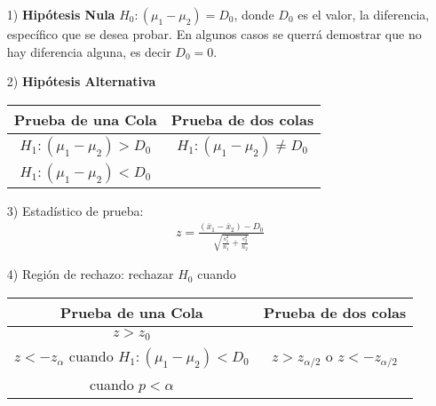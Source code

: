 \documentclass[a4paper]{report} %
\begin{document}
\begin{itemize}
\item[1) ] \textbf{Hip\'otesis Nula} $H_{0}:\left(\mu_{1}-\mu_{2}\right)=D_{0}$,
donde $D_{0}$ es el valor, la diferencia, espec\'ifico que se desea probar. En algunos casos se querr\'a demostrar que no hay diferencia alguna, es decir $D_{0}=0$.

\item[2) ] \textbf{Hip\'otesis Alternativa}
\begin{center}
\begin{tabular}{cc}\hline
\textbf{Prueba de una Cola} & \textbf{Prueba de dos colas}\\\hline
$H_{1}:\left(\mu_{1}-\mu_{2}\right)>D_{0}$ & $H_{1}:\left(\mu_{1}-\mu_{2}\right)\neq D_{0}$\\ 
$H_{1}:\left(\mu_{1}-\mu_{2}\right)<D_{0}$&\\
\end{tabular}
\end{center}

\item[3) ] Estad\'istico de prueba:
\begin{eqnarray}z=\frac{\left(\overline{x}_{1}-\overline{x}_{2}\right)-D_{0}}{\sqrt{\frac{s^{2}_{1}}{n_{1}}+\frac{s^{2}_{2}}{n_{2}}}}\end{eqnarray}
\item[4) ] Regi\'on de rechazo: rechazar $H_{0}$ cuando
\begin{center}
\begin{tabular}{cc}\hline
\textbf{Prueba de una Cola} & \textbf{Prueba de dos colas}\\\hline
$z>z_{0}$ & \\
$z<-z_{\alpha}$ cuando $H_{1}:\left(\mu_{1}-\mu_{2}\right)<D_{0}$&$z>z_{\alpha/2}$ o $z<-z_{\alpha/2}$\\
 cuando $p<\alpha$&\\
\end{tabular}
\end{center}
\end{itemize}
\end{document}
